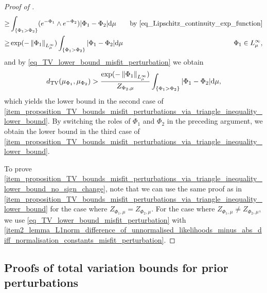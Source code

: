 \documentclass[a4paper]{scrartcl}
\theoremstyle{definition}
\numberwithin{equation}{section}
\newcommand{\rd}{\mathrm{d}}
\newcommand{\abs}[1]{\vert #1\vert}
\newcommand{\Norm}[1]{\left\Vert #1 \right\Vert}
\newcommand{\TV}[0]{\textup{TV}}
\begin{document}
\begin{proof}[Proof of ]
\begin{align*}
 \geq &  \int_{\{\Phi_1>\Phi_2\}} (e^{-\Phi_1}\wedge e^{-\Phi_2})\abs{\Phi_1-\Phi_2}\rd \mu &\text{by \eqref{eq_Lipschitz_continuity_exp_function}}
 \\
 \geq &  \exp(-\Norm{\Phi_1}_{L^\infty_\mu})\int_{\{\Phi_1>\Phi_2\}} \abs{\Phi_1-\Phi_2}\rd \mu & \Phi_1\in L^\infty_\mu,
 \end{align*}
and by \eqref{eq_TV_lower_bound_misfit_perturbation} we obtain
\begin{equation*}
 d_{\TV}(\mu_{\Phi_1},\mu_{\Phi_2})> \frac{\exp(-\Norm{\Phi_1}_{L^\infty_\mu})}{Z_{\Phi_2,\mu}}\int_{\{\Phi_1>\Phi_2\}} \abs{\Phi_1-\Phi_2}\rd \mu ,
\end{equation*}
which yields the lower bound in the second case of \cref{item_proposition_TV_bounds_misfit_perturbations_via_triangle_inequality_lower_bound}.
By switching the roles of $\Phi_1$ and $\Phi_2$ in the preceding argument, we obtain the lower bound in the third case of \cref{item_proposition_TV_bounds_misfit_perturbations_via_triangle_inequality_lower_bound}.

To prove \cref{item_proposition_TV_bounds_misfit_perturbations_via_triangle_inequality_lower_bound_no_sign_change}, note that we can use the same proof as in \cref{item_proposition_TV_bounds_misfit_perturbations_via_triangle_inequality_lower_bound} for the case where $Z_{\Phi_1,\mu}=Z_{\Phi_2,\mu}$. 
For the case where $Z_{\Phi_1,\mu}\neq Z_{\Phi_2,\mu}$, we use \eqref{eq_TV_lower_bound_misfit_perturbation} with \ref{item2_lemma_L1norm_difference_of_unnormalised_likelihoods_minus_abs_diff_normalisation_constants_misfit_perturbation}.
\end{proof}

\subsection{Proofs of total variation bounds for prior perturbations}
\label{section_TVbounds_Priorperturbations_proofs}
\end{document}
